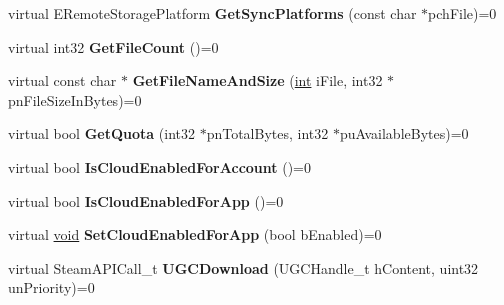 \begin{DoxyCompactItemize}
\item 
\hypertarget{classISteamRemoteStorage_a2e5271c730ebd8622a5c6f0e68eb5899}{}virtual E\+Remote\+Storage\+Platform {\bfseries Get\+Sync\+Platforms} (const char $\ast$pch\+File)=0\label{classISteamRemoteStorage_a2e5271c730ebd8622a5c6f0e68eb5899}

\item 
\hypertarget{classISteamRemoteStorage_adcc1532e744ee1c321b1b6e0552547b9}{}virtual int32 {\bfseries Get\+File\+Count} ()=0\label{classISteamRemoteStorage_adcc1532e744ee1c321b1b6e0552547b9}

\item 
\hypertarget{classISteamRemoteStorage_a956cc237e8982baffab7b9b165cf34b3}{}virtual const char $\ast$ {\bfseries Get\+File\+Name\+And\+Size} (\hyperlink{SDL__thread_8h_a6a64f9be4433e4de6e2f2f548cf3c08e}{int} i\+File, int32 $\ast$pn\+File\+Size\+In\+Bytes)=0\label{classISteamRemoteStorage_a956cc237e8982baffab7b9b165cf34b3}

\item 
\hypertarget{classISteamRemoteStorage_a84d6fc489519c455bbca86d46c28ec73}{}virtual bool {\bfseries Get\+Quota} (int32 $\ast$pn\+Total\+Bytes, int32 $\ast$pu\+Available\+Bytes)=0\label{classISteamRemoteStorage_a84d6fc489519c455bbca86d46c28ec73}

\item 
\hypertarget{classISteamRemoteStorage_acde8254bb043a055939e46480d382c81}{}virtual bool {\bfseries Is\+Cloud\+Enabled\+For\+Account} ()=0\label{classISteamRemoteStorage_acde8254bb043a055939e46480d382c81}

\item 
\hypertarget{classISteamRemoteStorage_aaa4f64630a531a5e9579e59a3517ef91}{}virtual bool {\bfseries Is\+Cloud\+Enabled\+For\+App} ()=0\label{classISteamRemoteStorage_aaa4f64630a531a5e9579e59a3517ef91}

\item 
\hypertarget{classISteamRemoteStorage_aa7b06f83c5a41a8565871d8ef69fb46d}{}virtual \hyperlink{SDL__audio_8h_a52835ae37c4bb905b903cbaf5d04b05f}{void} {\bfseries Set\+Cloud\+Enabled\+For\+App} (bool b\+Enabled)=0\label{classISteamRemoteStorage_aa7b06f83c5a41a8565871d8ef69fb46d}

\item 
\hypertarget{classISteamRemoteStorage_abe9fc55e988e8f6dff10cc6207550a82}{}virtual Steam\+A\+P\+I\+Call\+\_\+t {\bfseries U\+G\+C\+Download} (U\+G\+C\+Handle\+\_\+t h\+Content, uint32 un\+Priority)=0\label{classISteamRemoteStorage_abe9fc55e988e8f6dff10cc6207550a82}


\end{DoxyCompactItemize}
